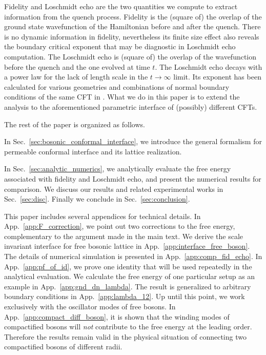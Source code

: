 Fidelity and Loschmidt echo are the two quantities we compute to extract information from the quench process. Fidelity is the (square of) the overlap of the ground state wavefunction of the Hamiltonian before and after the quench. There is no dynamic information in fidelity, nevertheless its finite size effect also reveals the boundary critical exponent that may be diagnostic in Loschmidt echo computation. The Loschmidt echo is (square of) the overlap of the wavefunction before the quench and the one evolved at time $t$. The Loschmidt echo decays with a power law for the lack of length scale in the $t \rightarrow \infty$ limit. Its exponent has been calculated for various geometries and combinations of normal boundary conditions of the same CFT in . What we do in this paper is to extend the analysis to the aforementioned parametric interface of (possibly) different CFTs. 

The rest of the paper is organized as follows. 

In Sec.~\ref{sec:bosonic_conformal_interface}, we introduce the general formalism for permeable conformal interface and its lattice realization. 

In Sec.~\ref{sec:analytic_numerics}, we analytically evaluate the free energy associated with fidelity and Loschmidt echo, and present the numerical results for comparison. We discuss our results and related experimental works in Sec.~\ref{sec:disc}. Finally we conclude in Sec.~\ref{sec:conclusion}. 

This paper includes several appendices for technical details. In App.~\ref{app:F_correction}, we point out two corrections to the free energy, complementary to the argument made in the main text. We derive the scale invariant interface for free bosonic lattice in App.~\ref{app:interface_free_boson}. The details of numerical simulation is presented in App.~\ref{app:comp_fid_echo}. In App.~\ref{app:pf_of_id}, we prove one identity that will be used repeatedly in the analytical evaluation. We calculate the free energy of one particular setup as an example in App.~\ref{app:gnd_dn_lambda}. The result is generalized to arbitrary boundary conditions in App.~\ref{app:lambda_12}. Up until this point, we work exclusively with the oscillator modes of free bosons. In App.~\ref{app:compact_diff_boson}, it is shown that the winding modes of compactified bosons will \emph{not} contribute to the free energy at the leading order. Therefore the results remain valid in the physical situation of connecting two compactified bosons of different radii.

